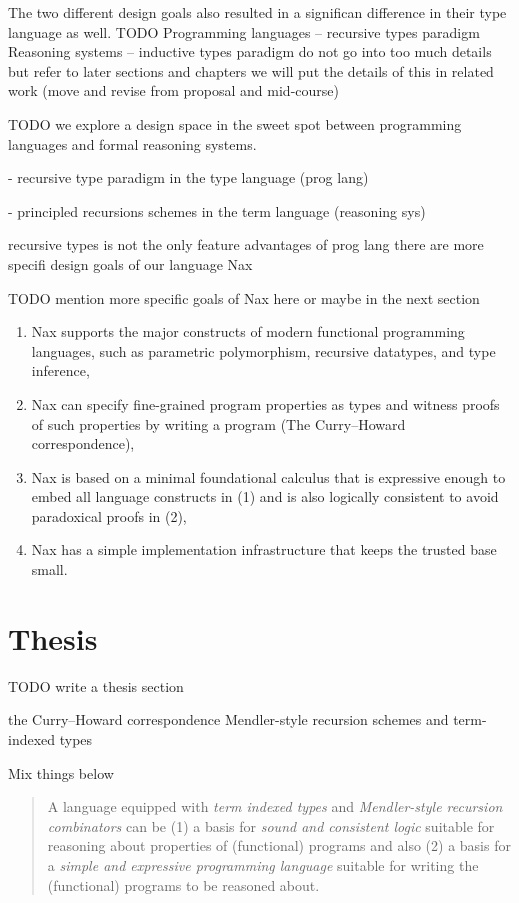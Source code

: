 The two different design goals also resulted in a significan difference
in their type language as well.
TODO
Programming languages -- recursive types paradigm
Reasoning systems -- inductive types paradigm
do not go into too much details but refer to later sections and chapters
we will put the details of this in related work
(move and revise from proposal and mid-course)

TODO
we explore a design space in the sweet spot between 
programming languages and formal reasoning systems.

- recursive type paradigm in the type language (prog lang)

- principled recursions schemes in the term language (reasoning sys)

recursive types is not the only feature
advantages of prog lang
there are more
specifi design goals of our language Nax


TODO mention more specific goals of Nax here or maybe in the next section
\begin{enumerate}[(1)]
 \item Nax supports the major constructs of modern
	 functional programming languages, such as
	 parametric polymorphism, recursive datatypes, and type inference,
 \item Nax can specify fine-grained program properties as types and
	 witness proofs of such properties by writing a program
	 (The Curry--Howard correspondence),
 \item Nax is based on a minimal foundational calculus
 that is expressive enough to embed all language constructs in (1)
 and is also logically consistent to avoid paradoxical proofs in (2),
 \item Nax has a simple implementation infrastructure
	 that keeps the trusted base small.
\end{enumerate}


\section{Thesis}\label{sec:intro:thesis}
TODO write a thesis section

the Curry--Howard correspondence
Mendler-style recursion schemes and term-indexed types

Mix things below

\begin{quote}
A language equipped with \emph{term indexed types} and
\emph{Mendler-style recursion combinators} can be 
(1) a basis for \emph{sound and consistent logic}
suitable for reasoning about properties of (functional) programs
and also
(2) a basis for a \emph{simple and expressive programming language}
suitable for writing the (functional) programs to be reasoned about.
\end{quote}



